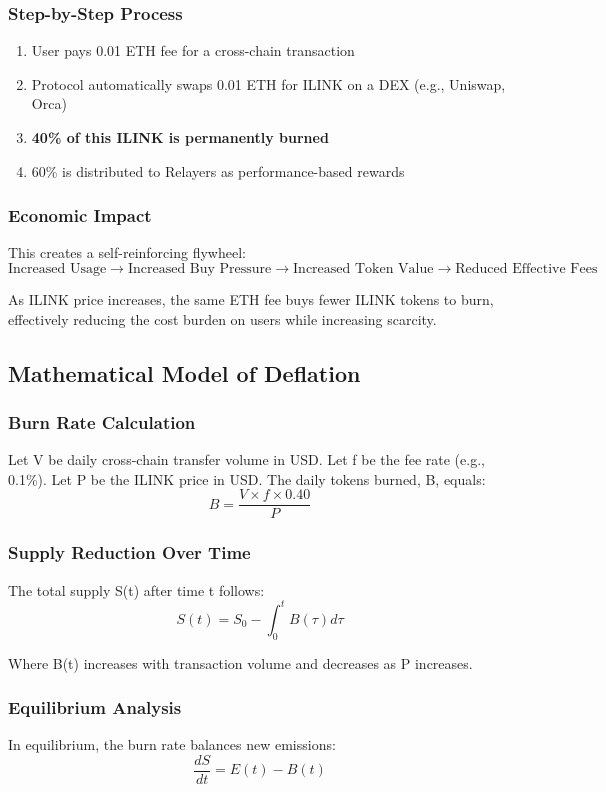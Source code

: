 \documentclass[11pt,a4paper]{article}
\begin{document}
\subsubsection{Step-by-Step Process}
\begin{enumerate}
    \item User pays 0.01 ETH fee for a cross-chain transaction
    \item Protocol automatically swaps 0.01 ETH for ILINK on a DEX (e.g., Uniswap, Orca)
    \item \textbf{40\% of this ILINK is permanently burned}
    \item 60\% is distributed to Relayers as performance-based rewards
\end{enumerate}

\subsubsection{Economic Impact}
This creates a self-reinforcing flywheel:
$$ \text{Increased Usage} \rightarrow \text{Increased Buy Pressure} \rightarrow \text{Increased Token Value} \rightarrow \text{Reduced Effective Fees} $$

As ILINK price increases, the same ETH fee buys fewer ILINK tokens to burn, effectively reducing the cost burden on users while increasing scarcity.

\subsection{Mathematical Model of Deflation}

\subsubsection{Burn Rate Calculation}
Let V be daily cross-chain transfer volume in USD.
Let f be the fee rate (e.g., 0.1\%).
Let P be the ILINK price in USD.
The daily tokens burned, B, equals:
$$ B = \frac{V \times f \times 0.40}{P} $$

\subsubsection{Supply Reduction Over Time}
The total supply S(t) after time t follows:
$$ S(t) = S_0 - \int_0^t B(\tau) d\tau $$

Where B(t) increases with transaction volume and decreases as P increases.

\subsubsection{Equilibrium Analysis}
In equilibrium, the burn rate balances new emissions:
$$ \frac{dS}{dt} = E(t) - B(t) $$
\end{document}
